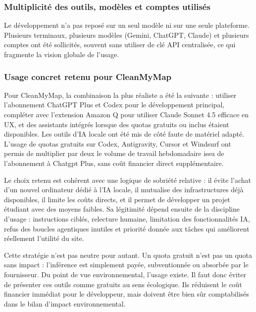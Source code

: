 \documentclass[
  10pt,
  a4paper,
  DIV=11,
  numbers=noendperiod,
  oneside]{scrreprt}
\begin{document}
\subsubsection{Multiplicité des outils, modèles et comptes
utilisés}\label{multiplicituxe9-des-outils-moduxe8les-et-comptes-utilisuxe9s}

Le développement n'a pas reposé sur un seul modèle ni sur une seule
plateforme. Plusieurs terminaux, plusieurs modèles (Gemini, ChatGPT,
Claude) et plusieurs comptes ont été sollicités, souvent sans utiliser
de clé API centralisée, ce qui fragmente la vision globale de l'usage.

\subsubsection{Usage concret retenu pour
CleanMyMap}\label{usage-concret-retenu-pour-cleanmymap}

Pour CleanMyMap, la combinaison la plus réaliste a été la suivante :
utiliser l'abonnement ChatGPT Plus et Codex pour le développement
principal, compléter avec l'extension Amazon Q pour utiliser Claude
Sonnet 4.5 efficace en UX, et des assistants intégrés lorsque des quotas
gratuits ou inclus étaient disponibles. Les outils d'IA locale ont été
mis de côté faute de matériel adapté. L'usage de quotas gratuits sur
Codex, Antigravity, Cursor et Windsurf ont permis de multiplier par deux
le volume de travail hebdomadaire issu de l'abonnement à Chatgpt Plus,
sans coût financier direct supplémentaire.

Le choix retenu est cohérent avec une logique de sobriété relative : il
évite l'achat d'un nouvel ordinateur dédié à l'IA locale, il mutualise
des infrastructures déjà disponibles, il limite les coûts directs, et il
permet de développer un projet étudiant avec des moyens faibles. Sa
légitimité dépend ensuite de la discipline d'usage : instructions
ciblés, relecture humaine, limitation des fonctionnalités IA, refus des
boucles agentiques inutiles et priorité donnée aux tâches qui améliorent
réellement l'utilité du site.

Cette stratégie n'est pas neutre pour autant. Un quota gratuit n'est pas
un quota sans impact : l'inférence est simplement payée, subventionnée
ou absorbée par le fournisseur. Du point de vue environnemental, l'usage
existe. Il faut donc éviter de présenter ces outils comme gratuits au
sens écologique. Ils réduisent le coût financier immédiat pour le
développeur, mais doivent être bien sûr comptabilisés dans le bilan
d'impact environnemental.
\end{document}
